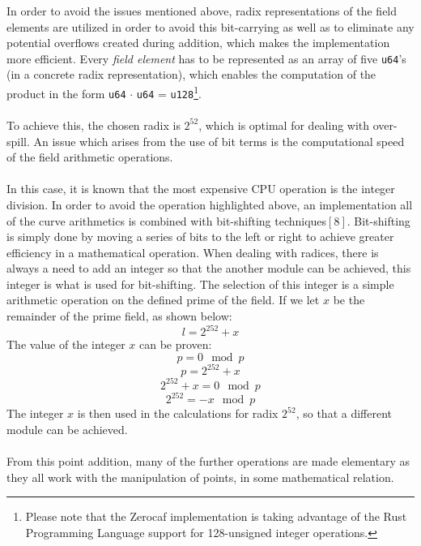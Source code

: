 \documentclass{article}
\begin{document}
In order to avoid the issues mentioned above, radix representations of the field elements are utilized in order to avoid this bit-carrying as well as to eliminate any potential overflows created during addition, which makes the implementation more efficient. Every \textit{field element} has to be represented as an array of five \texttt{u64}'s (in a concrete radix representation), which enables the computation of the product in the form \texttt{u64} $\cdot$ \texttt{u64} = \texttt{u128}\footnote{Please note that the Zerocaf implementation is taking advantage of the Rust Programming Language support for 128-unsigned integer operations.}.
\\\\
To achieve this, the chosen radix is $2^{52}$, which is optimal for dealing with over-spill. An issue which arises from the use of bit terms is the computational speed of the field arithmetic operations. \\\\
In this case, it is known that the most expensive CPU operation is the integer division. In order to avoid the operation highlighted above, an implementation all of the curve arithmetics is combined with bit-shifting techniques$[8]$. Bit-shifting is simply done by moving a series of bits to the left or right to achieve greater efficiency in a mathematical operation. When dealing with radices, there is always a need to add an integer so that the another module can be achieved, this integer is what is used for bit-shifting. The selection of this integer is a simple arithmetic operation on the defined prime of the field. 
If we let $x$ be the remainder of the prime field, as shown below:
$$ l = 2^{252}+x $$
The value of the integer $x$ can be proven:
$$ p = 0\mod p$$  
$$ p = 2^{252}+x $$
$$ 2^{252}+x = 0\mod p $$
$$ 2^{252} = -x\mod p $$
The integer $x$ is then used in the calculations for radix $2^{52}$, so that a different module can be achieved. \\\\
From this point addition, many of the further operations are made elementary as they all work with the manipulation of points, in some mathematical relation.  


\newpage
\end{document}
